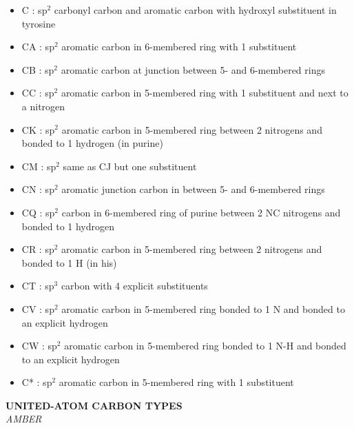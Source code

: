 \documentclass[a4paper]{article}
\begin{document}
\begin{itemize}
    \item C : sp$^2$ carbonyl carbon and aromatic carbon with hydroxyl substituent in tyrosine 
    \item CA : sp$^2$ aromatic carbon in 6-membered ring with 1 substituent 
    \item CB : sp$^2$ aromatic carbon at junction between 5- and 6-membered rings 
    \item CC : sp$^2$ aromatic carbon in 5-membered ring with 1 substituent and next to a nitrogen 
    \item CK : sp$^2$ aromatic carbon in 5-membered ring between 2 nitrogens and bonded to 1 hydrogen (in purine) 
    \item CM : sp$^2$ same as CJ but one substituent 
    \item CN : sp$^2$ aromatic junction carbon in between 5- and 6-membered rings 
    \item CQ : sp$^2$ carbon in 6-membered ring of purine between 2 NC nitrogens and bonded to 1 hydrogen 
    \item CR : sp$^2$ aromatic carbon in 5-membered ring between 2 nitrogens and bonded to 1 H (in his) 
    \item CT : sp$^3$ carbon with 4 explicit substituents 
    \item CV : sp$^2$ aromatic carbon in 5-membered ring bonded to 1 N and bonded to an explicit hydrogen 
    \item CW : sp$^2$ aromatic carbon in 5-membered ring bonded to 1 N-H and bonded to an explicit hydrogen 
    \item C* :  sp$^2$ aromatic carbon in 5-membered ring with 1 substituent
\end{itemize}
\vspace{3mm}
%
%
%
\textbf{\normalsize UNITED-ATOM CARBON TYPES}\\
\hspace{3mm}\textit{\small AMBER}
\end{document}
